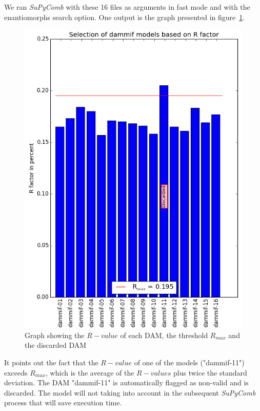 \documentclass[a4paper, 11pt]{report}
\begin{document}
We ran \textit{SuPyComb} with these 16 files as arguments in fast mode 
and with the enantiomorphs search option. 
One output is the graph presented in figure~\ref{fgr:rfactor}. 
\begin{figure}
\centering
\includegraphics[scale=0.6]{Rfactor.png}
\caption{Graph showing the $R-value$ of each DAM, the threshold $R_{max}$ 
         and the discarded DAM}
\label{fgr:rfactor}
\end{figure}
It points out the fact that the $R-value$ of one of the models 
("dammif-11") exceeds $R_{max}$, which is the average of the 
$R-values$ plus twice the standard deviation. 
The DAM "dammif-11" is automatically flagged as non-valid and is 
discarded. 
The model will not taking into account in the subsequent 
\textit{SuPyComb} process that will save execution time.
\end{document}
